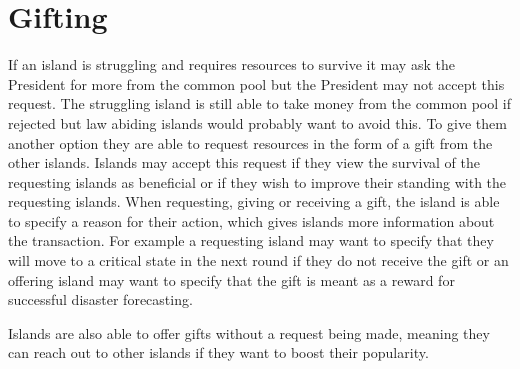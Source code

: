 \section{Gifting}  
\label{sec:IITO:gifting}  

If an island is struggling and requires resources to survive it may ask the President for more from the common pool but the President may not accept this request. The struggling island is still able to take money from the common pool if rejected but law abiding islands would probably want to avoid this. To give them another option they are able to request resources in the form of a gift from the other islands. Islands may accept this request if they view the survival of the requesting islands as beneficial or if they wish to improve their standing with the requesting islands. When requesting, giving or receiving a gift, the island is able to specify a reason for their action, which gives islands more information about the transaction. For example a requesting island may want to specify that they will move to a critical state in the next round if they do not receive the gift or an offering island may want to specify that the gift is meant as a reward for successful disaster forecasting.

Islands are also able to offer gifts without a request being made, meaning they can reach out to other islands if they want to boost their popularity.